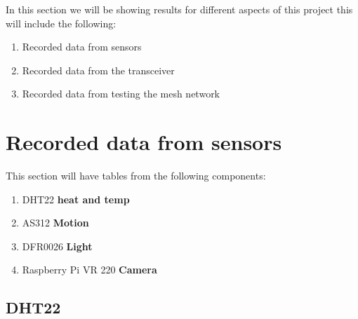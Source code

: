 In this section we will  be showing results for  different aspects of this project this  will  include the following:
\begin{enumerate}
    \item Recorded data from sensors
    \item Recorded data from the transceiver
    \item Recorded data from  testing the mesh network
\end{enumerate}
\section{Recorded data from sensors}
This section  will have  tables from the following components:
\begin{enumerate}
    \item DHT22 \textbf{heat and temp}
    \item AS312 \textbf{Motion }
    \item DFR0026 \textbf{Light}
    \item Raspberry Pi VR 220 \textbf{Camera}
\end{enumerate}
\subsection{DHT22}
